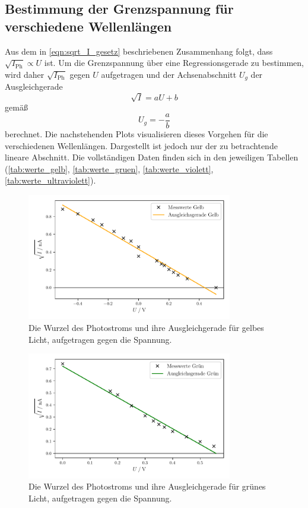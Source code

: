 \subsection{Bestimmung der Grenzspannung für verschiedene Wellenlängen}

Aus dem in \autoref{eqn:sqrt_I_gesetz} beschriebenen Zusammenhang folgt, dass $\sqrt{I_\text{Ph}} \propto U$ ist.
Um die Grenzspannung über eine Regressionsgerade zu bestimmen,
wird daher $\sqrt{I_\text{Ph}}$ gegen $U$ aufgetragen
und der Achsenabschnitt $U_g$ der Ausgleichgerade
\begin{equation*}
  \sqrt{I} = aU + b
\end{equation*}
gemäß
\begin{equation*}
    U_g = - \frac{a}{b}
\end{equation*}
berechnet.
Die nachstehenden Plots visualisieren dieses Vorgehen für die verschiedenen Wellenlängen.
Dargestellt ist jedoch nur der zu betrachtende lineare Abschnitt.
Die vollständigen Daten finden sich in den jeweiligen Tabellen
(\ref{tab:werte_gelb}, \ref{tab:werte_gruen}, \ref{tab:werte_violett}, \ref{tab:werte_ultraviolett}).

\begin{figure}[H]
    \centering
    \includegraphics[width=0.8\textwidth]{build/plot_sqrt_gelb.pdf}
    \caption{Die Wurzel des Photostroms und ihre Ausgleichgerade für gelbes Licht, aufgetragen gegen die Spannung.}
    \label{fig:plot_sqrt_gelb}
\end{figure}

\begin{figure}[H]
    \centering
    \includegraphics[width=0.8\textwidth]{build/plot_sqrt_gruen.pdf}
    \caption{Die Wurzel des Photostroms und ihre Ausgleichgerade für grünes Licht, aufgetragen gegen die Spannung.}
    \label{fig:plot_sqrt_gruen}
\end{figure}

